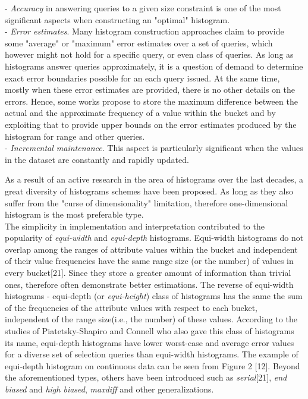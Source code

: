 \documentclass[10pt, conference, compsocconf]{IEEEtran}
\begin{document}
- \textit{Accuracy} in answering queries to a given size constraint is one of the most significant aspects when constructing an "optimal" histogram. \\
- \textit{Error estimates}. Many histogram construction approaches claim to provide some "average" or "maximum" error estimates over a set of queries, which however might not hold for a specific query, or even class of queries. As long as histograms answer queries approximately, it is a question of demand to determine exact error boundaries possible for an each query issued. At the same time, mostly when these error estimates are provided, there is no other details on the errors. Hence, some works propose to store the maximum difference between the actual and the approximate frequency of a value within the bucket and by exploiting that to provide upper bounds on the error estimates produced by the histogram for range and other queries.\\
- \textit{Incremental maintenance}. This aspect is particularly significant when the values in the dataset are constantly and rapidly updated.

As a result of an active research in the area of histograms over the last decades, a great diversity of histograms schemes have been proposed.  
As long as they also suffer from the "curse of dimensionality" limitation, therefore one-dimensional histogram is the most preferable type. \\The simplicity in implementation and interpretation contributed to the popularity of \textit{equi-width} and \textit{equi-depth} histograms. Equi-width histograms do not overlap among the ranges of attribute values within the bucket and independent of their value frequencies have the same range size (or the number) of values in every bucket[21]. Since they store a greater amount of information than trivial ones, therefore often demonstrate better estimations. The reverse of equi-width histograms - equi-depth (or \textit{equi-height}) class of histograms has the same the sum of the frequencies of the attribute values with respect to each bucket, independent of the range size(i.e., the number) of these values. According to the studies of Piatetsky-Shapiro and Connell who also gave this class of histograms its name, equi-depth histograms have lower worst-case and average error values for a diverse set of selection queries than equi-width histograms. The example of equi-depth histogram on continuous data can be seen from Figure 2 [12].
Beyond the aforementioned types, others have been introduced such as \textit{serial}[21], \textit{end biased} and \textit{high biased}, \textit{maxdiff} and other generalizations. 
\end{document}
